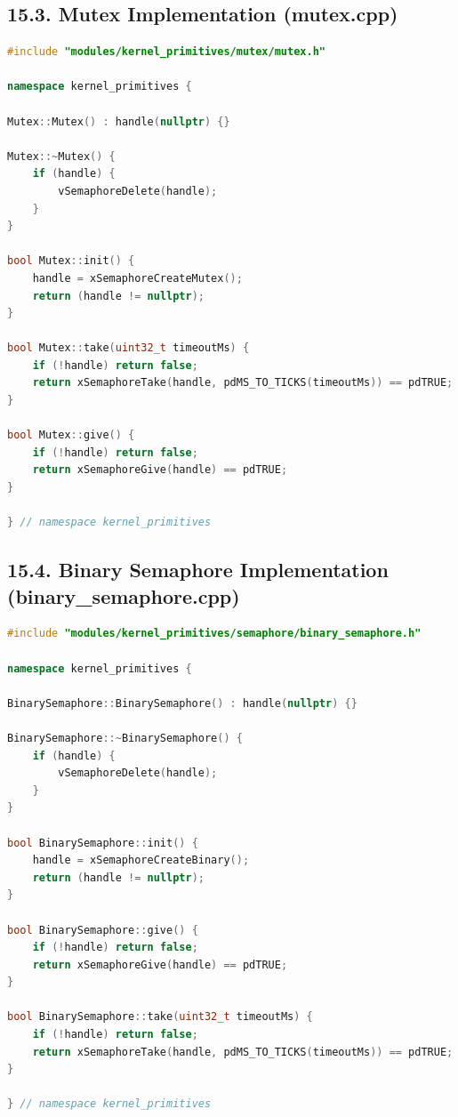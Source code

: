 \documentclass[12pt]{article}
\begin{document}
\subsection*{15.3. Mutex Implementation (mutex.cpp)}

\begin{lstlisting}[language=C++, caption=mutex.cpp - Mutex Implementation]
#include "modules/kernel_primitives/mutex/mutex.h"

namespace kernel_primitives {

Mutex::Mutex() : handle(nullptr) {}

Mutex::~Mutex() {
    if (handle) {
        vSemaphoreDelete(handle);
    }
}

bool Mutex::init() {
    handle = xSemaphoreCreateMutex();
    return (handle != nullptr);
}

bool Mutex::take(uint32_t timeoutMs) {
    if (!handle) return false;
    return xSemaphoreTake(handle, pdMS_TO_TICKS(timeoutMs)) == pdTRUE;
}

bool Mutex::give() {
    if (!handle) return false;
    return xSemaphoreGive(handle) == pdTRUE;
}

} // namespace kernel_primitives
\end{lstlisting}

\subsection*{15.4. Binary Semaphore Implementation (binary\_semaphore.cpp)}

\begin{lstlisting}[language=C++, caption=binary\_semaphore.cpp - Binary Semaphore Implementation]
#include "modules/kernel_primitives/semaphore/binary_semaphore.h"

namespace kernel_primitives {

BinarySemaphore::BinarySemaphore() : handle(nullptr) {}

BinarySemaphore::~BinarySemaphore() {
    if (handle) {
        vSemaphoreDelete(handle);
    }
}

bool BinarySemaphore::init() {
    handle = xSemaphoreCreateBinary();
    return (handle != nullptr);
}

bool BinarySemaphore::give() {
    if (!handle) return false;
    return xSemaphoreGive(handle) == pdTRUE;
}

bool BinarySemaphore::take(uint32_t timeoutMs) {
    if (!handle) return false;
    return xSemaphoreTake(handle, pdMS_TO_TICKS(timeoutMs)) == pdTRUE;
}

} // namespace kernel_primitives
\end{lstlisting}
\end{document}
